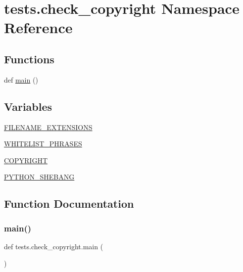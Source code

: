 \hypertarget{namespacetests_1_1check__copyright}{}\section{tests.\+check\+\_\+copyright Namespace Reference}
\label{namespacetests_1_1check__copyright}
\subsection*{Functions}
\begin{DoxyCompactItemize}
\item 
def \hyperlink{namespacetests_1_1check__copyright_a9fcf3c755e0bf8e93320f2f09bd7ce04}{main} ()
\end{DoxyCompactItemize}
\subsection*{Variables}
\begin{DoxyCompactItemize}
\item 
\hyperlink{namespacetests_1_1check__copyright_af73f59f49275a23b52addda3278068db}{F\+I\+L\+E\+N\+A\+M\+E\+\_\+\+E\+X\+T\+E\+N\+S\+I\+O\+NS}
\item 
\hyperlink{namespacetests_1_1check__copyright_af4202011da6a1540735f6cf9f7a30c61}{W\+H\+I\+T\+E\+L\+I\+S\+T\+\_\+\+P\+H\+R\+A\+S\+ES}
\item 
\hyperlink{namespacetests_1_1check__copyright_a2aae78d9a278ab846941cce2c4c4c469}{C\+O\+P\+Y\+R\+I\+G\+HT}
\item 
\hyperlink{namespacetests_1_1check__copyright_a9dbdfa97d33aee4ae178b7b514e644bf}{P\+Y\+T\+H\+O\+N\+\_\+\+S\+H\+E\+B\+A\+NG}
\end{DoxyCompactItemize}


\subsection{Function Documentation}
\mbox{\label{namespacetests_1_1check__copyright_a9fcf3c755e0bf8e93320f2f09bd7ce04}} 
\subsubsection{\texorpdfstring{main()}{main()}}
{\footnotesize\ttfamily def tests.\+check\+\_\+copyright.\+main (\begin{DoxyParamCaption}{ }\end{DoxyParamCaption})}



